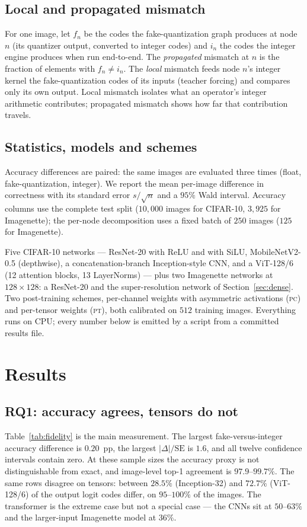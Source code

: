\documentclass[journal]{IEEEtran}
\begin{document}
\subsection{Local and propagated mismatch}
For one image, let $f_n$ be the codes the fake-quantization graph produces at node $n$ (its quantizer output,
converted to integer codes) and $i_n$ the codes the integer engine produces when run end-to-end. The
\emph{propagated} mismatch at $n$ is the fraction of elements with $f_n \neq i_n$. The \emph{local} mismatch
feeds node $n$'s integer kernel the fake-quantization codes of its inputs (teacher forcing) and compares only
its own output. Local mismatch isolates what an operator's integer arithmetic contributes; propagated
mismatch shows how far that contribution travels.

\subsection{Statistics, models and schemes}
Accuracy differences are paired: the same images are evaluated three times (float, fake-quantization,
integer). We report the mean per-image difference in correctness with its standard error $s/\sqrt{n}$ and a
$95\%$ Wald interval. Accuracy columns use the complete test split ($10{,}000$ images for CIFAR-10, $3{,}925$
for Imagenette); the per-node decomposition uses a fixed batch of $250$ images ($125$ for Imagenette).

Five CIFAR-10 networks --- ResNet-20 with ReLU and with SiLU, MobileNetV2-0.5 (depthwise), a
concatenation-branch Inception-style CNN, and a ViT-128/6 (12 attention blocks, 13 LayerNorms) --- plus two
Imagenette networks at $128\times128$: a ResNet-20 and the super-resolution network of
Section~\ref{sec:dense}. Two post-training schemes, per-channel weights with asymmetric activations
(\textsc{pc}) and per-tensor weights (\textsc{pt}), both calibrated on $512$ training images. Everything runs
on CPU; every number below is emitted by a script from a committed results file.

\section{Results}

\subsection{RQ1: accuracy agrees, tensors do not}
Table~\ref{tab:fidelity} is the main measurement. The largest fake-versus-integer accuracy difference is
$0.20$~pp, the largest $|\Delta|/\mathrm{SE}$ is $1.6$, and all twelve confidence intervals contain zero. At
these sample sizes the accuracy proxy is not distinguishable from exact, and image-level top-1 agreement is
$97.9$--$99.7\%$. The same rows disagree on tensors: between $28.5\%$ (Inception-32) and $72.7\%$
(ViT-128/6) of the output logit codes differ, on $95$--$100\%$ of the images. The transformer is the extreme
case but not a special case --- the CNNs sit at $50$--$63\%$ and the larger-input Imagenette model at $36\%$.
\end{document}
